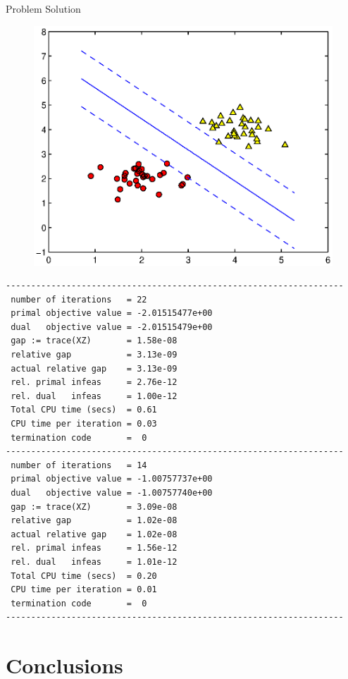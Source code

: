 \documentclass{beamer}
\begin{document}
\begin{frame}{Problem Solution}
    \begin{figure}[!htb]
        \centering
        \includegraphics[width=.9\textwidth]{figures/solution.eps}
    \end{figure}
\end{frame}

\begin{frame}[fragile]
    \scriptsize
    \begin{verbatim}
-------------------------------------------------------------------
 number of iterations   = 22
 primal objective value = -2.01515477e+00
 dual   objective value = -2.01515479e+00
 gap := trace(XZ)       = 1.58e-08
 relative gap           = 3.13e-09
 actual relative gap    = 3.13e-09
 rel. primal infeas     = 2.76e-12
 rel. dual   infeas     = 1.00e-12
 Total CPU time (secs)  = 0.61  
 CPU time per iteration = 0.03  
 termination code       =  0
-------------------------------------------------------------------
 number of iterations   = 14
 primal objective value = -1.00757737e+00
 dual   objective value = -1.00757740e+00
 gap := trace(XZ)       = 3.09e-08
 relative gap           = 1.02e-08
 actual relative gap    = 1.02e-08
 rel. primal infeas     = 1.56e-12
 rel. dual   infeas     = 1.01e-12
 Total CPU time (secs)  = 0.20  
 CPU time per iteration = 0.01  
 termination code       =  0
-------------------------------------------------------------------
    \end{verbatim}
    
    
\end{frame}


\section{Conclusions}
\end{document}
